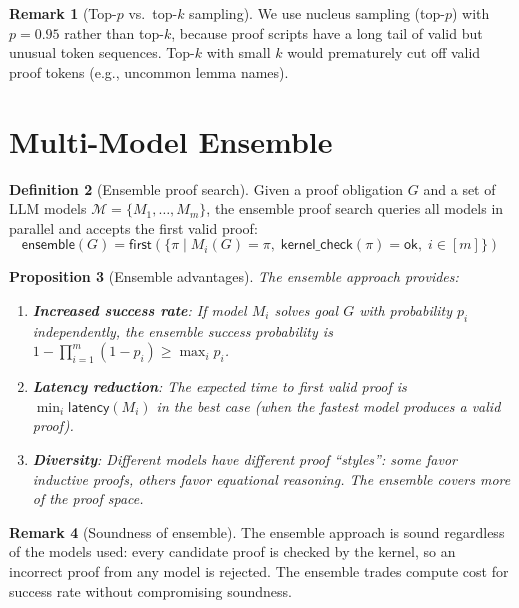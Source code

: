 \documentclass[11pt,a4paper]{report}
\theoremstyle{definition}
\newtheorem{definition}{Definition}[chapter]
\newtheorem{remark}[definition]{Remark}
\theoremstyle{plain}
\newtheorem{proposition}[definition]{Proposition}
\begin{document}
\begin{remark}[Top-$p$ vs.\ top-$k$ sampling]
We use nucleus sampling (top-$p$) with $p = 0.95$ rather than top-$k$, because
proof scripts have a long tail of valid but unusual token sequences.  Top-$k$
with small $k$ would prematurely cut off valid proof tokens (e.g., uncommon
lemma names).
\end{remark}


\section{Multi-Model Ensemble}

\begin{definition}[Ensemble proof search]
\label{def:ensemble}
Given a proof obligation $G$ and a set of LLM models
$\mathcal{M} = \{M_1, \ldots, M_m\}$, the ensemble proof search queries all
models in parallel and accepts the first valid proof:
\[
  \mathsf{ensemble}(G) = \mathsf{first}\!\left(
    \{\pi \mid M_i(G) = \pi,\; \mathsf{kernel\_check}(\pi) = \mathsf{ok},\;
    i \in [m]\}
  \right)
\]
\end{definition}

\begin{proposition}[Ensemble advantages]
The ensemble approach provides:
\begin{enumerate}
  \item \textbf{Increased success rate}: If model $M_i$ solves goal $G$ with
    probability $p_i$ independently, the ensemble success probability is
    $1 - \prod_{i=1}^m (1 - p_i) \geq \max_i p_i$.
  \item \textbf{Latency reduction}: The expected time to first valid proof is
    $\min_i \mathsf{latency}(M_i)$ in the best case (when the fastest model
    produces a valid proof).
  \item \textbf{Diversity}: Different models have different proof ``styles'':
    some favor inductive proofs, others favor equational reasoning.  The
    ensemble covers more of the proof space.
\end{enumerate}
\end{proposition}

\begin{remark}[Soundness of ensemble]
The ensemble approach is sound regardless of the models used: every candidate
proof is checked by the kernel, so an incorrect proof from any model is
rejected.  The ensemble trades compute cost for success rate without
compromising soundness.
\end{remark}
\end{document}
